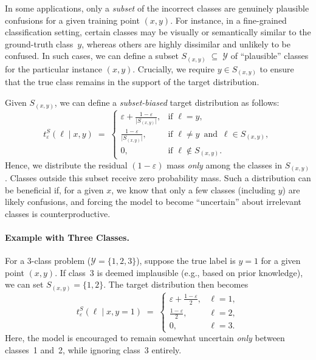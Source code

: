 In some applications, only a \emph{subset} of the incorrect classes are genuinely plausible confusions for a given training point \((x,y)\). For instance, in a fine-grained classification setting, certain classes may be visually or semantically similar to the ground-truth class~\(y\), whereas others are highly dissimilar and unlikely to be confused. In such cases, we can define a subset $S_{(x,y)} \;\subseteq\; \mathcal{Y}$ of “plausible” classes for the particular instance \((x,y)\). Crucially, we require \(y \in S_{(x,y)}\) to ensure that the true class remains in the support of the target distribution.

Given \(S_{(x,y)}\), we can define a \emph{subset-biased} target distribution as follows:
\begin{equation}
  t^{S}_\varepsilon(\ell \mid x,y) \;=\;
  \begin{cases}
    \displaystyle \varepsilon + \frac{1-\varepsilon}{\lvert S_{(x,y)}\rvert}, 
      & \text{if } \ell = y, \\[8pt]
    \displaystyle \frac{1-\varepsilon}{\lvert S_{(x,y)}\rvert}, 
      & \text{if } \ell \neq y \,\text{ and }\, \ell \in S_{(x,y)}, \\[6pt]
    0, 
      & \text{if } \ell \notin S_{(x,y)}.
  \end{cases}
\end{equation}
Hence, we distribute the residual \((1-\varepsilon)\) mass \emph{only} among the classes in \(S_{(x,y)}\). Classes outside this subset receive zero probability mass. Such a distribution can be beneficial if, for a given \(x\), we know that only a few classes (including \(y\)) are likely confusions, and forcing the model to become “uncertain” about irrelevant classes is counterproductive.

\paragraph{Example with Three Classes.}
For a 3-class problem (\(\mathcal{Y} = \{1,2,3\}\)), suppose the true label is \(y=1\) for a given point \((x,y)\). If class~3 is deemed implausible (e.g., based on prior knowledge), we can set \(S_{(x,y)} = \{1,2\}\). The target distribution then becomes
\begin{equation}
  t^{S}_\varepsilon(\ell \mid x, y=1) \;=\;
  \begin{cases}
    \varepsilon + \frac{1-\varepsilon}{2}, & \ell=1, \\
    \frac{1-\varepsilon}{2}, & \ell=2, \\
    0, & \ell=3.
  \end{cases}
\end{equation}
Here, the model is encouraged to remain somewhat uncertain \emph{only} between classes~1 and~2, while ignoring class~3 entirely.

